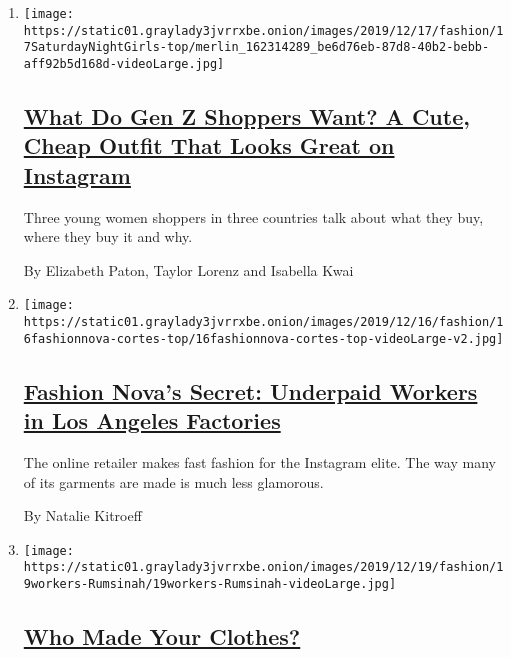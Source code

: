 \begin{enumerate}
\def\labelenumi{\arabic{enumi}.}
\item
  \texttt{[image: https://static01.graylady3jvrrxbe.onion/images/2019/12/17/fashion/17SaturdayNightGirls-top/merlin\_162314289\_be6d76eb-87d8-40b2-bebb-aff92b5d168d-videoLarge.jpg]}

  \hypertarget{what-do-gen-z-shoppers-want-a-cute-cheap-outfit-that-looks-great-on-instagram}{%
  \subsection{\texorpdfstring{\href{/2019/12/17/style/fast-fashion-gen-z.html}{What
  Do Gen Z Shoppers Want? A Cute, Cheap Outfit That Looks Great on
  Instagram}}{What Do Gen Z Shoppers Want? A Cute, Cheap Outfit That Looks Great on Instagram}}\label{what-do-gen-z-shoppers-want-a-cute-cheap-outfit-that-looks-great-on-instagram}}

  Three young women shoppers in three countries talk about what they
  buy, where they buy it and why.

  By Elizabeth Paton, Taylor Lorenz and Isabella Kwai
\item
  \texttt{[image: https://static01.graylady3jvrrxbe.onion/images/2019/12/16/fashion/16fashionnova-cortes-top/16fashionnova-cortes-top-videoLarge-v2.jpg]}

  \hypertarget{fashion-novas-secret-underpaid-workers-in-los-angeles-factories}{%
  \subsection{\texorpdfstring{\href{/2019/12/16/business/fashion-nova-underpaid-workers.html}{Fashion
  Nova's Secret: Underpaid Workers in Los Angeles
  Factories}}{Fashion Nova's Secret: Underpaid Workers in Los Angeles Factories}}\label{fashion-novas-secret-underpaid-workers-in-los-angeles-factories}}

  The online retailer makes fast fashion for the Instagram elite. The
  way many of its garments are made is much less glamorous.

  By Natalie Kitroeff
\item
  \texttt{[image: https://static01.graylady3jvrrxbe.onion/images/2019/12/19/fashion/19workers-Rumsinah/19workers-Rumsinah-videoLarge.jpg]}

  \hypertarget{who-made-your-clothes}{%
  \subsection{\texorpdfstring{\href{/2019/12/19/style/garment-workers-around-the-world.html}{Who
  Made Your
  Clothes?}}{Who Made Your Clothes?}}\label{who-made-your-clothes}}


\end{enumerate}
